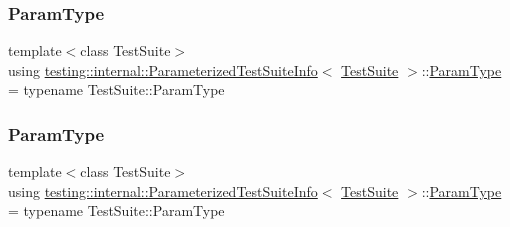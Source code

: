 \mbox{\label{classtesting_1_1internal_1_1_parameterized_test_suite_info_a10761bd750a6820a8d8d2c654b10fe54}} 
\subsubsection{\texorpdfstring{ParamType}{ParamType}\hspace{0.1cm}{\footnotesize\ttfamily [1/2]}}
{\footnotesize\ttfamily template$<$class Test\+Suite$>$ \\
using \mbox{\hyperlink{classtesting_1_1internal_1_1_parameterized_test_suite_info}{testing\+::internal\+::\+Parameterized\+Test\+Suite\+Info}}$<$ \mbox{\hyperlink{classtesting_1_1_test_suite}{Test\+Suite}} $>$\+::\mbox{\hyperlink{classtesting_1_1internal_1_1_parameterized_test_suite_info_a10761bd750a6820a8d8d2c654b10fe54}{Param\+Type}} =  typename Test\+Suite\+::\+Param\+Type}

\mbox{\label{classtesting_1_1internal_1_1_parameterized_test_suite_info_a10761bd750a6820a8d8d2c654b10fe54}} 
\subsubsection{\texorpdfstring{ParamType}{ParamType}\hspace{0.1cm}{\footnotesize\ttfamily [2/2]}}
{\footnotesize\ttfamily template$<$class Test\+Suite$>$ \\
using \mbox{\hyperlink{classtesting_1_1internal_1_1_parameterized_test_suite_info}{testing\+::internal\+::\+Parameterized\+Test\+Suite\+Info}}$<$ \mbox{\hyperlink{classtesting_1_1_test_suite}{Test\+Suite}} $>$\+::\mbox{\hyperlink{classtesting_1_1internal_1_1_parameterized_test_suite_info_a10761bd750a6820a8d8d2c654b10fe54}{Param\+Type}} =  typename Test\+Suite\+::\+Param\+Type}

